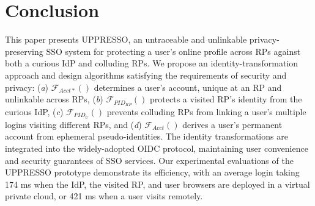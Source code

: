 \section{Conclusion}
\label{sec:conclusion}
This paper presents UPPRESSO, an untraceable and unlinkable privacy-preserving SSO system for protecting a user's online profile across RPs against both a curious IdP and colluding RPs.
We propose an identity-transformation approach and design algorithms satisfying the requirements of security and privacy: (\emph{a}) $\mathcal{F}_{Acct\ast}()$ determines a user's account, unique at an RP and unlinkable across RPs,
(\emph{b}) $\mathcal{F}_{PID_{RP}}()$ protects a visited RP's identity from the curious IdP, (\emph{c}) $\mathcal{F}_{PID_{U}}()$ prevents colluding RPs from linking a user's multiple logins visiting different RPs, and (\emph{d}) $\mathcal{F}_{Acct}()$ derives a user's permanent account from ephemeral pseudo-identities.
The identity transformations are integrated into the widely-adopted OIDC protocol, maintaining user convenience and security guarantees of SSO services. Our experimental evaluations of the UPPRESSO prototype demonstrate its efficiency, with an average login taking 174 ms when the IdP, the visited RP, and user browsers are deployed in a virtual private cloud, or 421 ms when a user visits remotely.


